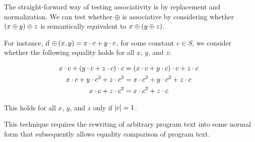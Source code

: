 
The straight-forward way of testing associativity is by replacement and
normalization. We can test whether $\oplus$ is associative by considering
whether $\left({x \oplus y}\right) \oplus z$ is semantically equivalent to $x \oplus \left({y
\oplus z}\right)$.

For instance, if $\oplus\left({x,y}\right) = x\cdot c + y \cdot c$, for some constant
$c\in S$, we consider whether the following equality holds for all $x$, $y$,
and $z$:

\begin{align*}
x\cdot c + \left({y\cdot c + z\cdot c}\right)\cdot c &= \left({x\cdot c + y\cdot c}\right)\cdot c + z\cdot c \\
x\cdot c + y\cdot c^2 + z\cdot c^2 &= x\cdot c^2 + y\cdot c^2 + z\cdot c \\
x\cdot c + z\cdot c^2 &= x\cdot c^2 + z\cdot c
\end{align*}

This holds for all $x$, $y$, and $z$ only if $\left|{c}\right|=1$.

This technique requires the rewriting of arbitrary program text into some
normal form that subsequently allows equality comparison of program text.
